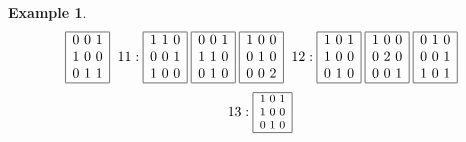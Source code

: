 \documentclass[12pt]{article}
\theoremstyle{definition}
\newtheorem{Example}[Theorem]{Example}
\begin{document}
\begin{Example}
\[{\begin{array}{|c|}
\end{array}
\hspace*{1mm}
\begin{array}{|c|}\hline
0\ 0\ 1\\ 1\ 0\ 0\\ 0\ 1\ 1\\ \hline
\end{array}
\hspace*{2mm}
11: 
\begin{array}{|c|}\hline
1\ 1\ 0\\ 0\ 0\ 1\\ 1\ 0\ 0\\ \hline
\end{array}
\hspace*{1mm}
\begin{array}{|c|}\hline
0\ 0\ 1\\ 1\ 1\ 0\\ 0\ 1\ 0\\ \hline
\end{array}
\hspace*{1mm}
\begin{array}{|c|}\hline
1\ 0\ 0\\ 0\ 1\ 0\\ 0\ 0\ 2\\ \hline
\end{array}
\hspace*{2mm}
12: 
\begin{array}{|c|}\hline
1\ 0\ 1\\ 1\ 0\ 0\\ 0\ 1\ 0\\ \hline
\end{array}
\hspace*{1mm}
\begin{array}{|c|}\hline
1\ 0\ 0\\ 0\ 2\ 0\\ 0\ 0\ 1\\ \hline
\end{array}
\hspace*{1mm}
\begin{array}{|c|}\hline
0\ 1\ 0\\ 0\ 0\ 1\\ 1\ 0\ 1\\ \hline
\end{array}
}\]
\[{\footnotesize
13: 
\begin{array}{|c|}\hline
1\ 0\ 1\\ 1\ 0\ 0\\ 0\ 1\ 0\\ \hline

\end{array}}\]
\end{Example}
\end{document}
